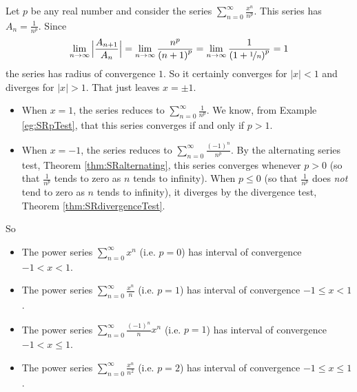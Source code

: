 \begin{eg}\label{eg:SRintervalofconvergence}
Let $p$ be any real number and consider the series
$\sum_{n=0}^\infty \frac{x^n}{n^p}$. This series has $A_n= \frac{1}{n^p}$.
Since
\begin{equation*}
\lim_{n\rightarrow\infty}\Big|\frac{A_{n+1}}{A_n}\Big|
=\lim_{n\rightarrow\infty}\frac{n^p}{{(n+1)}^p}
=\lim_{n\rightarrow\infty}\frac{1}{{(1+\nicefrac{1}{n})}^p}
=1
\end{equation*}
the series has radius of convergence $1$. So it certainly converges for
$|x|<1$ and diverges for $|x|>1$. That just leaves $x=\pm 1$.
\begin{itemize}
\item
When $x=1$, the series reduces to $\sum_{n=0}^\infty \frac{1}{n^p}$.
We know, from Example \ref{eg:SRpTest}, that this series converges if and
only if $p>1$.
\item
When $x=-1$, the series reduces to $\sum_{n=0}^\infty \frac{(-1)^n}{n^p}$.
By the alternating series test, Theorem \ref{thm:SRalternating}, this series
converges whenever $p>0$ (so that $\frac{1}{n^p}$ tends to zero
as $n$ tends to infinity). When $p\le 0$ (so that $\frac{1}{n^p}$ does
\emph{not} tend to zero as $n$ tends to infinity), it diverges by
the divergence test, Theorem \ref{thm:SRdivergenceTest}.
\end{itemize}
So
\begin{itemize}
\item The power series $\sum_{n=0}^\infty x^n$ (i.e. $p=0$)
has interval of convergence $-1<x<1$.
\item The power series $\sum_{n=0}^\infty \frac{x^n}{n}$ (i.e. $p=1$)
has interval of convergence $-1\le x<1$.
\item The power series $\sum_{n=0}^\infty \frac{(-1)^n}{n}x^n$ (i.e. $p=1$)
has interval of convergence $-1< x\le 1$.
\item The power series $\sum_{n=0}^\infty \frac{x^n}{n^2}$ (i.e. $p=2$)
has interval of convergence $-1\le x\le 1$.
\end{itemize}
\end{eg}

